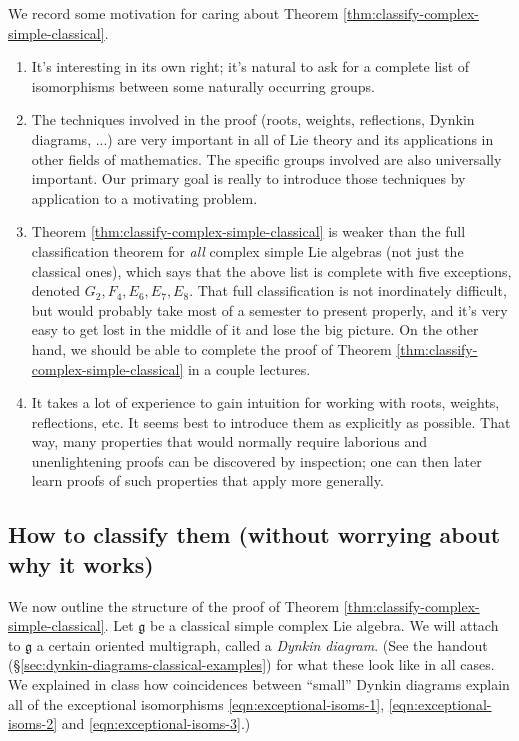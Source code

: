 \documentclass[reqno]{amsart} 
\begin{document}
\begin{remark}
  We record some motivation for caring about Theorem \ref{thm:classify-complex-simple-classical}.
  \begin{enumerate}
  \item It's interesting in its own right; it's natural to ask for a complete list of isomorphisms between some naturally occurring groups.
  \item The techniques involved in the proof (roots, weights, reflections, Dynkin diagrams, ...)  are very important in all of Lie theory and its applications in other fields of mathematics.  The specific groups involved are also universally important.  Our primary goal is really to introduce those techniques by application to a motivating problem.
  \item Theorem \ref{thm:classify-complex-simple-classical} is weaker than the full classification theorem for \emph{all} complex simple Lie algebras (not just the classical ones), which says that the above list is complete with five exceptions, denoted $G_2, F_4, E_6, E_7, E_8$.  That full classification is not inordinately difficult, but would probably take most of a semester to present properly, and it's very easy to get lost in the middle of it and lose the big picture.  On the other hand, we should be able to complete the proof of Theorem \ref{thm:classify-complex-simple-classical} in a couple lectures.
  \item It takes a lot of experience to gain intuition for working with roots, weights, reflections, etc.  It seems best to introduce them as explicitly as possible.  That way, many properties that would normally require laborious and unenlightening proofs can be discovered by inspection; one can then later learn proofs of such properties that apply more generally.
  \end{enumerate}
\end{remark}

\subsection{How to classify them (without worrying about why it works)\label{sec:how-to-classify}}
\label{sec:orgaf78e16}
We now outline the structure of the proof of Theorem \ref{thm:classify-complex-simple-classical}.  Let $\mathfrak{g}$ be a classical simple complex Lie algebra.  We will attach to $\mathfrak{g}$ a certain oriented multigraph, called a \emph{Dynkin diagram}.  (See the handout (\S\ref{sec:dynkin-diagrams-classical-examples}) for what these look like in all cases.  We explained in class how coincidences between ``small'' Dynkin diagrams explain all of the exceptional isomorphisms \eqref{eqn:exceptional-isoms-1}, \eqref{eqn:exceptional-isoms-2} and \eqref{eqn:exceptional-isoms-3}.)
\end{document}
